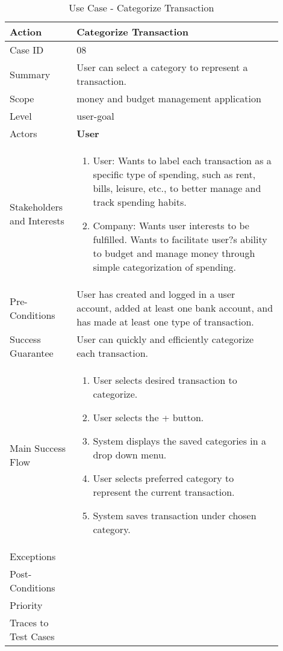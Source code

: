 \documentclass[11pt]{article}
\newcounter{use case ID}
\newcommand\tabularhead[1]{
\begin{table}[ht]
    \addtocounter{use case ID}{1}
    \caption{Use Case \arabic{use case ID} - #1}
    \vspace{0.2cm}
    \begin{tabular}{|p{0.2\linewidth}|p{0.70\linewidth}|}
    \hline
        \textbf{Action} & \textbf{#1} \\
        \hline}
\newcommand\addrow[2]{#1 & #2\\ \hline}
\newcommand\addmulrow[2]{ \begin{minipage}[t][][t]{2.5cm}#1\end{minipage}
        &\begin{minipage}[t][][t]{11cm}
        \begin{enumerate}[itemsep=-1ex] #2   \end{enumerate}
    \end{minipage}\vfill\\ \hline}
\newenvironment{usecase}{\tabularhead}
{\hline\end{tabular}\end{table}}
\begin{document}
\begin{usecase}{Categorize Transaction}
    \addrow{Case ID}{08}
    \addrow{Summary}{User can select a category to represent a transaction.}
    \addrow{Scope}{money and budget management application}
    \addrow{Level}{user-goal}
    \addrow{Actors}{\textbf{User}}
    \addmulrow{Stakeholders and Interests}{
        \item User: Wants to label each transaction as a specific type of spending, such as rent, bills, leisure, etc., to better manage and track spending habits.
        \item Company: Wants user interests to be fulfilled. Wants to facilitate user?s ability to budget and manage money through simple categorization of spending.}
    \addrow{Pre-Conditions}{User has created and logged in a user account, added at least one bank account, and has made at least one type of transaction.}
    \addrow{Success Guarantee}{User can quickly and efficiently categorize each transaction.}
    \addmulrow{Main Success Flow}{
        \item User selects desired transaction to categorize.
        \item User selects the + button.
        \item System displays the saved categories in a drop down menu.
        \item User selects preferred category to represent the current transaction.
        \item System saves transaction under chosen category.}
        \addrow{Exceptions}{}
    \addrow{Post-Conditions}{}
    \addrow{Priority}{}
    \addrow{Traces to Test Cases}{}
\end{usecase}
\end{document}
